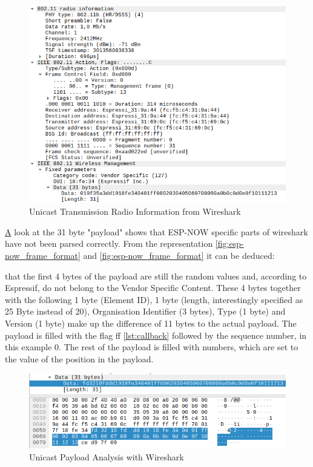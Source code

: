 \begin{figure}[h]
	\centering
	\includegraphics[scale=0.4]{figures/wiresharkUCFrame.png}
	\caption{Unicast Transmission Radio Information from Wireshark}
	\label{fig:wiresharkUCTransmission}
\end{figure}

\href{lst:callback}
A look at the 31 byte "payload" shows that ESP-NOW specific parts of wireshark have not been parsed correctly.
From the representation \cref{fig:esp-now_frame_format} and \cref{fig:esp-now_frame_format} it can be deduced:

that the first 4 bytes of the payload are still the random values and, according to Espressif, 
do not belong to the Vendor Specific Content.
These 4 bytes together with the following 1 byte (Element ID), 1 byte (length, interestingly specified as 25 Byte instead of 20),
Organisation Identifier (3 bytes), Type (1 byte) and Version (1 byte) make up the difference of 11 bytes to the actual payload.
The payload is filled with the flag ff \cref{lst:callback} followed by the sequence number, in this example 0.
The rest of the payload is filled with numbers, which are set to the value of the position in the payload.

\begin{figure}[h]
	\centering
	\includegraphics[scale=0.4]{figures/wiresharkPayload.png}
	\caption{Unicast Payload Analysis with Wireshark}
	\label{fig:wiresharkPayload}
\end{figure}

